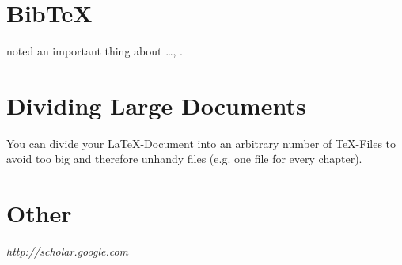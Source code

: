 \documentclass[12pt,a4paper,oneside]{report}
\begin{document}



	\section{BibTeX}
	\label{sec:BibTeX}

	\textcite{AbedonHymanThomas2003}

	\citeauthor{goossens93} noted an important thing about \ldots, \parencite{greenwade93}.



	\section{Dividing Large Documents}
	\label{sec:dividing}

	You can divide your \LaTeX-Document into an arbitrary number of \TeX-Files
	to avoid too big and therefore unhandy files (e.g. one file for every chapter).



	\section{Other}
	\label{sec:Other}

	\emph{http://scholar.google.com}





	\clearpage
	\listoffigures

	\clearpage
	\listoftables

	\appendix

	\printbibliography[title=References]
\end{document}
